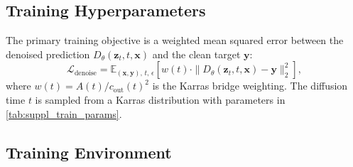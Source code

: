 \subsection{Training Hyperparameters}
The primary training objective is a weighted mean squared error between the denoised prediction $D_\theta(\bm{z}_t, t, \bm{x})$ and the clean target $\bm{y}$:
\begin{equation}
    \mathcal{L}_{\text{denoise}} = \mathbb{E}_{(\bm{x},\bm{y}),\, t,\, \epsilon} \left[ w(t) \cdot \| D_\theta(\bm{z}_t, t, \bm{x}) - \bm{y} \|_2^2 \right],
    \label{eq:suppl_denoising_loss}
\end{equation}
where $w(t) = A(t) / c_{\text{out}}(t)^2$ is the Karras bridge weighting. The diffusion time $t$ is sampled from a Karras distribution with parameters in \cref{tab:suppl_train_params}.

\begin{table}[h]
\centering
\caption{{\color{gray}Training time-sampling parameters.}}
\label{tab:suppl_train_params}
{\color{gray}
%
}
\end{table}

\subsection{Training Environment}
\label{sec:suppl_impl_env}

{\color{gray}
\begin{table}[h]
\centering
\caption{{\color{gray}Implementation hyperparameters and training environment.}}
\label{tab:suppl_impl_params}
{\color{gray}
%
}
\end{table}
}

